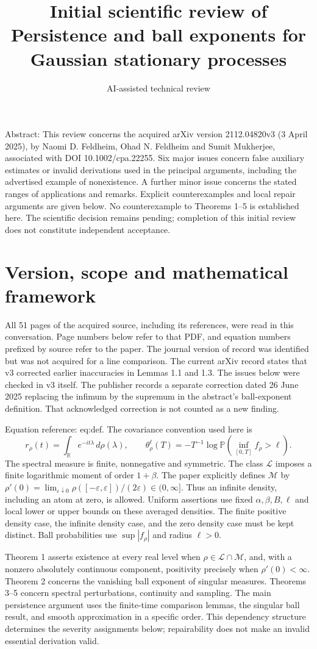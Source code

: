 \documentclass[10pt]{article}
\title{Initial scientific review of
Persistence and ball exponents for Gaussian stationary processes}
\author{AI-assisted technical review}
\date{}
\begin{document}
\maketitle
Abstract: This review concerns the acquired arXiv version 2112.04820v3 (3 April 2025), by Naomi D. Feldheim, Ohad N. Feldheim and Sumit Mukherjee, associated with DOI 10.1002/cpa.22255. Six major issues concern false auxiliary estimates or invalid derivations used in the principal arguments, including the advertised example of nonexistence. A further minor issue concerns the stated ranges of applications and remarks. Explicit counterexamples and local repair arguments are given below. No counterexample to Theorems 1–5 is established here. The scientific decision remains pending; completion of this initial review does not constitute independent acceptance.\par
\section*{Version, scope and mathematical framework}
All 51 pages of the acquired source, including its references, were read in this conversation. Page numbers below refer to that PDF, and equation numbers prefixed by source refer to the paper. The journal version of record was identified but was not acquired for a line comparison. The current arXiv record states that v3 corrected earlier inaccuracies in Lemmas 1.1 and 1.3. The issues below were checked in v3 itself. The publisher records a separate correction dated 26 June 2025 replacing the infimum by the supremum in the abstract’s ball-exponent definition. That acknowledged correction is not counted as a new finding.\par
Equation reference: eq:def. The covariance convention used here is \[r_\rho(t)=\int_{\mathbb R}e^{-it\lambda}\,d\rho(\lambda),\qquad
 \theta_\rho^\ell(T)=-T^{-1}\log\mathbb P(\inf_{[0,T]}f_\rho>\ell).
 \] The spectral measure is finite, nonnegative and symmetric. The class \(\mathcal L\) imposes a finite logarithmic moment of order \(1+\beta\). The paper explicitly defines \(\mathcal M\) by \(\rho'(0)=\lim_{\varepsilon\downarrow0}
\rho([-\varepsilon,\varepsilon])/(2\varepsilon)\in(0,\infty]\). Thus an infinite density, including an atom at zero, is allowed. Uniform assertions use fixed \(\alpha,\beta,B,\ell\) and local lower or upper bounds on these averaged densities. The finite positive density case, the infinite density case, and the zero density case must be kept distinct. Ball probabilities use \(\sup|f_\rho|\) and radius \(\ell>0\).\par
Theorem 1 asserts existence at every real level when \(\rho\in\mathcal L\cap\mathcal M\), and, with a nonzero absolutely continuous component, positivity precisely when \(\rho'(0)<\infty\). Theorem 2 concerns the vanishing ball exponent of singular measures. Theorems 3–5 concern spectral perturbations, continuity and sampling. The main persistence argument uses the finite-time comparison lemmas, the singular ball result, and smooth approximation in a specific order. This dependency structure determines the severity assignments below; repairability does not make an invalid essential derivation valid.\par
\end{document}

